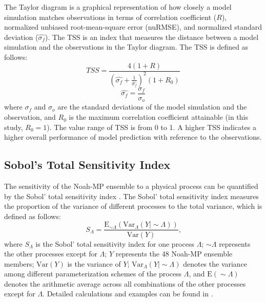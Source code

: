 \documentclass[essd, manuscript]{copernicus}
\begin{document}
The Taylor diagram \citep{taylor2001JGRA} is a graphical representation of how closely a model simulation matches observations in terms of correlation coefficient (\(R\)), normalized unbiased root-mean-square error (nuRMSE), and normalized standard deviation (\(\widehat{\sigma_{f}}\)). The TSS is an index that measures the distance between a model simulation and the observations in the Taylor diagram. The TSS is defined as follows:
\begin{equation}
  TSS = \frac{4 (1 + R)}{(\widehat{\sigma_{f}} + \frac{1}{\widehat{\sigma_{f}}})^2 ( 1 + R_{0})}
\end{equation}
\begin{equation}
  \widehat{\sigma_{f}} = \frac{\sigma_{f}}{\sigma_{o}}
\end{equation}
where \(\sigma_{f}\) and \(\sigma_{o}\) are the standard deviations of the model simulation and the observation, and \(R_{0}\) is the maximum correlation coefficient attainable (in this study, \(R_{0} = 1\)). The value range of TSS is from 0 to 1. A higher TSS indicates a higher overall performance of model prediction with reference to the observations.

\subsection{Sobol's Total Sensitivity Index}\label{sec:methods:sobol}

The sensitivity of the Noah-MP ensemble to a physical process can be quantified by the Sobol' total sensitivity index \citep{sobol1993MMCE, zheng2019WRR}. The Sobol' total sensitivity index measures the proportion of the variance of different processes to the total variance, which is defined as follows:
\begin{equation}
  S_{\Lambda} = \frac{\mathrm{E}_{\sim\Lambda}(\mathrm{Var}_{\Lambda}(Y|\sim\Lambda))}{\mathrm{Var}(Y)}
  \text{,}
\end{equation}
where \(S_{\Lambda}\) is the Sobol' total sensitivity index for one process \(\Lambda\); \(\sim\Lambda\) represents the other processes except for \(\Lambda\); \(Y\) represents the 48 Noah-MP ensemble members; \(\mathrm{Var}(Y)\) is the variance of \(Y\); \(\mathrm{Var}_{\Lambda}(Y|\sim\Lambda)\) denotes the variance among different parameterization schemes of the process \(\Lambda\), and \(\mathrm{E}(\sim\Lambda)\) denotes the arithmetic average across all combinations of the other processes except for \(\Lambda\). Detailed calculations and examples can be found in \citet[Appendix A]{zheng2019WRR}.
\end{document}
